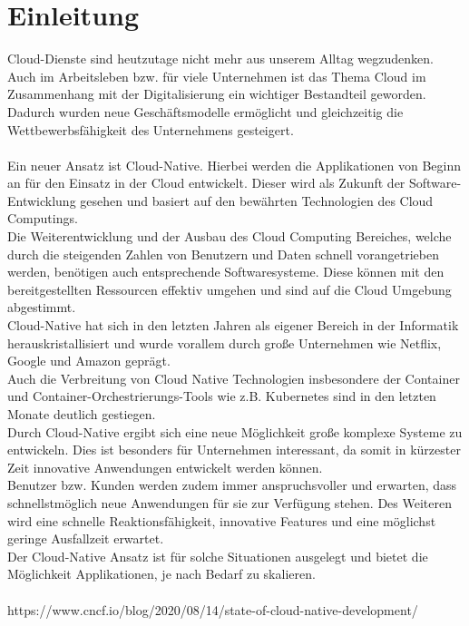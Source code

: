 \chapter{Einleitung}
Cloud-Dienste sind heutzutage nicht mehr aus unserem Alltag wegzudenken. Auch im Arbeitsleben bzw. für viele Unternehmen ist das Thema Cloud im Zusammenhang mit der Digitalisierung ein wichtiger Bestandteil geworden. Dadurch wurden neue Geschäftsmodelle ermöglicht und gleichzeitig die Wettbewerbsfähigkeit des Unternehmens gesteigert.\\
\\
Ein neuer Ansatz ist Cloud-Native. Hierbei werden die Applikationen von Beginn an für den Einsatz in der Cloud entwickelt. Dieser wird als Zukunft der Software-Entwicklung gesehen und basiert auf den bewährten Technologien des Cloud Computings.\\
Die Weiterentwicklung und der Ausbau des Cloud Computing Bereiches, welche durch die steigenden Zahlen von Benutzern und Daten schnell vorangetrieben werden, benötigen auch entsprechende Softwaresysteme. Diese können mit den bereitgestellten Ressourcen effektiv umgehen und sind auf die Cloud Umgebung abgestimmt.\\
Cloud-Native hat sich in den letzten Jahren als eigener Bereich in der Informatik herauskristallisiert und wurde vorallem durch große Unternehmen wie Netflix, Google und Amazon geprägt.\\
Auch die Verbreitung von Cloud Native Technologien insbesondere der Container und Container-Orchestrierungs-Tools wie z.B. Kubernetes sind in den letzten Monate deutlich gestiegen.\\
Durch Cloud-Native ergibt sich eine neue Möglichkeit große komplexe Systeme zu entwickeln. Dies ist besonders für Unternehmen interessant, da somit in kürzester Zeit innovative Anwendungen entwickelt werden können.\\
Benutzer bzw. Kunden werden zudem immer anspruchsvoller und erwarten, dass schnellstmöglich neue Anwendungen für sie zur Verfügung stehen. Des Weiteren wird eine schnelle Reaktionsfähigkeit, innovative Features und eine möglichst geringe Ausfallzeit erwartet.\\
Der Cloud-Native Ansatz ist für solche Situationen ausgelegt und bietet die Möglichkeit Applikationen, je nach Bedarf zu skalieren.\\
\\

https://www.cncf.io/blog/2020/08/14/state-of-cloud-native-development/